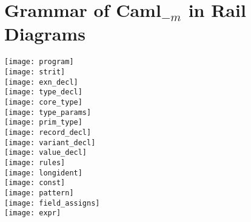 \section{Grammar of Caml$_{-m}$ in Rail Diagrams}
\label{sec:grammar}
\texttt{[image: program]} \\[0.2em]
\texttt{[image: strit]} \\[0.2em]
\texttt{[image: exn\_decl]} \\[0.2em]
\texttt{[image: type\_decl]} \\[0.2em]
\texttt{[image: core\_type]} \\[0.2em]
\texttt{[image: type\_params]} \\[0.2em]
\texttt{[image: prim\_type]} \\[0.2em]
\texttt{[image: record\_decl]} \\[0.2em]
\texttt{[image: variant\_decl]} \\[0.2em]
\texttt{[image: value\_decl]} \\[0.2em]
\texttt{[image: rules]} \\[0.2em]
\texttt{[image: longident]} \\[0.2em]
\texttt{[image: const]} \\[0.2em]
\texttt{[image: pattern]} \\[0.2em]
\texttt{[image: field\_assigns]} \\[0.2em]
\texttt{[image: expr]} 

